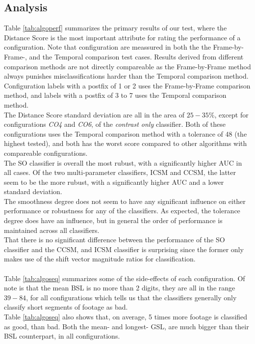 \subsection{Analysis}
%
Table \ref{tab:algoperf} summarizes the primary results of our test, where the Distance Score is the most important attribute for rating the performance of a configuration. Note that configuration are meassured in both the the Frame-by-Frame-, and the Temporal comparison test cases. Results derived from different comparison methods are not directly compareable as the Frame-by-Frame method always punishes misclassifications harder than the Temporal comparison method. Configuration labels with a postfix of 1 or 2 uses the Frame-by-Frame comparison method, and labels with a postfix of 3 to 7 uses the Temporal comparison method.\\
The Distance Score standard deviation are all in the area of $25-35\%$, except for configurations \textit{CO4} and \textit{CO6}, of the \textit{contrast only} classifier. Both of these configurations uses the Temporal comparison method with a tolerance of 48 (the highest tested), and both has the worst score compared to other algorithms with compareable configurations.\\
The SO classifier is overall the most rubust, with a significantly higher AUC in all cases. Of the two multi-parameter classifiers, ICSM and CCSM, the latter seem to be the more rubust, with a significantly higher AUC and a lower standard deviation.\\
The smoothness degree does not seem to have any significant influence on either performance or robustness for any of the classifiers. As expected, the tolerance degree does have an influence, but in general the order of performance is maintained across all classifiers.\\
That there is no significant difference between the performance of the SO classifier and the CCSM, and ICSM classifier is surprising since the former only makes use of the shift vector magnitude ratios for classification.\\
\\
Table \ref{tab:algoseq} summarizes some of the side-effects of each configuration. Of note is that the mean BSL is no more than 2 digits, they are all in the range $39-84$, for all configurations which tells us that the classifiers generally only classify short segments of footage as bad.\\
Table \ref{tab:algoseq} also shows that, on average, 5 times more footage is classified as good, than bad. Both the mean- and longest- GSL, are much bigger than their BSL counterpart, in all configurations.\\
%
